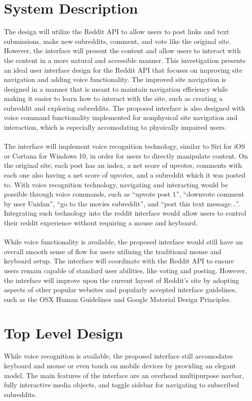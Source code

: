 \documentclass{article}
\begin{document}
\section{System Description} The design will utilize the Reddit API to allow users to post links and text submissions, make new subreddits, comment, and vote like the original site. However, the interface will present the content and allow users to interact with the content in a more natural and accessible manner. This investigation presents an ideal user interface design for the Reddit API that focuses on improving site navigation and adding voice functionality. The improved site navigation is designed in a manner that is meant to maintain navigation efficiency while making it easier to learn how to interact with the site, such as creating a subreddit and exploring subreddits. The proposed interface is also designed with voice command functionality implemented for nonphysical site navigation and interaction, which is especially accomodating to physically impaired users.\\
\\
\indent The interface will implement voice recognition technology, similar to Siri for iOS or Cortana for Windows 10, in order for users to directly manipulate content. On the original site, each post has an index, a net score of upvotes, comments with each one also having a net score of upvotes, and a subreddit which it was posted to. With voice recognition technology, navigating and interacting would be possible through voice commands, such as ``upvote post 1'', ``downvote comment by user Unidan'', ``go to the movies subreddit'', and ``post this text message...''. Integrating such technology into the reddit interface would allow users to control their reddit experience without requiring a mouse and keyboard.\\
\\
\indent While voice functionality is available, the proposed interface would still have an overall smooth sense of flow for users utilizing the traditional mouse and keyboard setup. The interface will coordinate with the Reddit API to ensure users remain capable of standard user abilities, like voting and posting. However, the interface will improve upon the current layout of Reddit's site by adopting aspects of other popular websites and popularly accepted interface guidelines, such as the OSX Human Guidelines and Google Material Design Principles.

\section{Top Level Design} While voice recognition is available, the proposed interface still accomodates keyboard and mouse or even touch on mobile devices by providing an elegant model. The main features of the interface are an overhead multipurpose navbar, fully interactive media objects, and toggle sidebar for navigating to subscribed subreddits.
\end{document}
